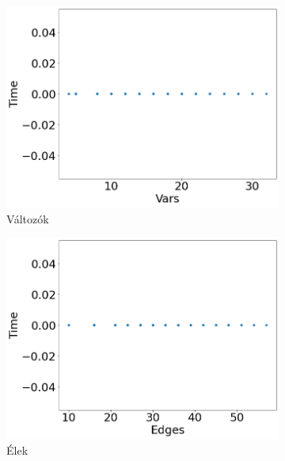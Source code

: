 \begin{figure}[ht] 
	\begin{subfigure}[b]{0.5\linewidth}
		\centering
		\includegraphics[width=0.95\linewidth]{figures/locks/vars.png} 
		\caption{Változók} 
		\label{fig7:a} 
		\vspace{4ex}
	\end{subfigure}%
	\begin{subfigure}[b]{0.5\linewidth}
		\centering
		\includegraphics[width=0.95\linewidth]{figures/locks/edges.png} 
		\caption{Élek} 
		\label{fig7:b} 
		\vspace{4ex}
	\end{subfigure} 
	\begin{subfigure}[b]{0.5\linewidth}
		\centering

\end{subfigure}
\end{figure}
